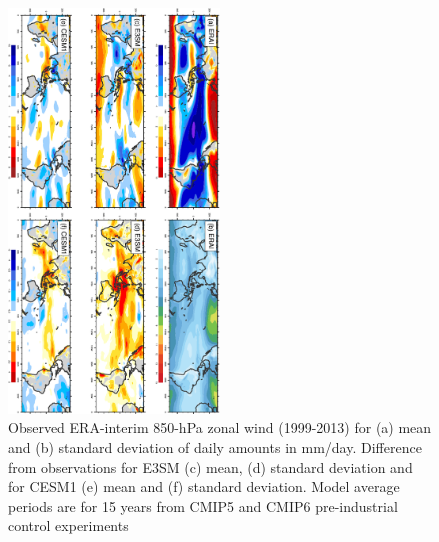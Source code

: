 \documentclass[draft,ms]{AGUTeX}
\begin{document}
\begin{article}
\begin{figure}[fp]
  \begin{center}
    \noindent\includegraphics[width=0.5\textwidth,angle=90.]{./figs/f_mean_var_U850_DJF.pdf}
  \end{center}
  \caption{Observed ERA-interim 850-hPa zonal wind (1999-2013) for (a) mean and (b) standard deviation of daily amounts in mm/day. Difference from observations for E3SM (c) mean, (d) standard deviation and for CESM1 (e) mean and (f) standard deviation. Model average periods are for 15 years from CMIP5 and CMIP6 pre-industrial control experiments} 
\label{f_mean_var_U850_DJF}
\end{figure}


\end{article}
\end{document}
